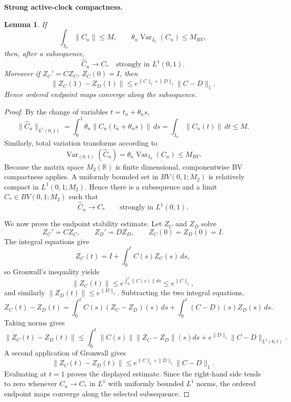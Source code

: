 \documentclass[11pt]{article}
\newtheorem{lemma}[theorem]{Lemma}
\theoremstyle{definition}\newtheorem{definition}[theorem]{Definition}
\theoremstyle{remark}\newtheorem{remark}[theorem]{Remark}
\newcommand{\R}{\mathbb R}\newcommand{\dd}{\,d}\newcommand{\HH}{\mathcal H}
\begin{document}
\medskip
\noindent\textbf{Strong active-clock compactness.}
\begin{lemma}\label{lem:bvcompact}
If
\[
\int_{I_n}\|C_n\|\le M,
\qquad
\theta_n\operatorname{Var}_{I_n}(C_n)\le M_{BV},
\]
then, after a subsequence,
\[
\widehat C_n\to C_*
\quad\text{strongly in }L^1(0,1).
\]
Moreover if $Z_C'=CZ_C$, $Z_C(0)=I$, then
\[
\boxed{
\|Z_C(1)-Z_D(1)\|
\le e^{\|C\|_1+\|D\|_1}\|C-D\|_1.
}
\]
Hence ordered endpoint maps converge along the subsequence.
\end{lemma}
\begin{proof}
By the change of variables $t=t_n+\theta_ns$,
\[
 \|\widehat C_n\|_{L^1(0,1)}
 =\int_0^1\theta_n\|C_n(t_n+\theta_ns)\|\,ds
 =\int_{I_n}\|C_n(t)\|\,dt
 \le M.
\]
Similarly, total variation transforms according to
\[
 \operatorname{Var}_{(0,1)}(\widehat C_n)
 =\theta_n\operatorname{Var}_{I_n}(C_n)
 \le M_{BV}.
\]
Because the matrix space $M_2(\R)$ is finite dimensional, componentwise BV compactness applies.  A uniformly bounded set in $BV(0,1;M_2)$ is relatively compact in $L^1(0,1;M_2)$.  Hence there is a subsequence and a limit $C_*\in BV(0,1;M_2)$ such that
\[
 \widehat C_n\to C_*
 \qquad\text{strongly in }L^1(0,1).
\]

We now prove the endpoint stability estimate.  Let $Z_C$ and $Z_D$ solve
\[
 Z_C'=CZ_C,
 \qquad
 Z_D'=DZ_D,
 \qquad
 Z_C(0)=Z_D(0)=I.
\]
The integral equations give
\[
 Z_C(t)=I+\int_0^tC(s)Z_C(s)\,ds,
\]
so Gronwall's inequality yields
\[
 \|Z_C(t)\|\le e^{\int_0^t\|C(s)\|ds}\le e^{\|C\|_1},
\]
and similarly $\|Z_D(t)\|\le e^{\|D\|_1}$.
Subtracting the two integral equations,
\[
 Z_C(t)-Z_D(t)
 =\int_0^tC(s)(Z_C-Z_D)(s)\,ds
 +\int_0^t(C-D)(s)Z_D(s)\,ds.
\]
Taking norms gives
\[
 \|Z_C(t)-Z_D(t)\|
 \le\int_0^t\|C(s)\|\|Z_C-Z_D\|(s)ds
 +e^{\|D\|_1}\|C-D\|_{L^1(0,t)}.
\]
A second application of Gronwall gives
\[
 \|Z_C(t)-Z_D(t)\|
 \le e^{\|C\|_1+\|D\|_1}\|C-D\|_1.
\]
Evaluating at $t=1$ proves the displayed estimate.  Since the right-hand side tends to zero whenever $C_n\to C_*$ in $L^1$ with uniformly bounded $L^1$ norms, the ordered endpoint maps converge along the selected subsequence.
\end{proof}
\end{document}
